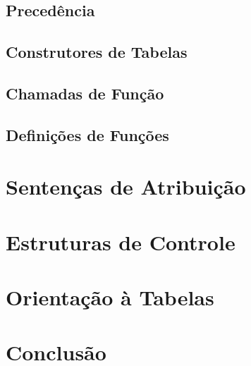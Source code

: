 \documentclass[
12pt, %
openright, %
oneside, %
a4paper, %
english, %
brazil, %
]{abntex2}
\begin{document}
\section{Precedência}
\section{Construtores de Tabelas}
\section{Chamadas de Função}
\section{Definições de Funções}

\chapter{Sentenças de Atribuição}
\chapter{Estruturas de Controle}
\chapter{Orientação à Tabelas}



\chapter{Conclusão}
\cite{Sebesta}
\cite{Lua_Org}


\postextual







\end{document}
